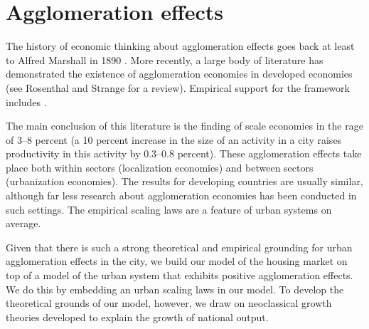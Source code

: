\section{Agglomeration effects}
The history of economic thinking about agglomeration effects goes back at least to  Alfred Marshall in 1890 \cite{giddingsPRINCIPLESECONOMICSAlfred1890}. %
More recently, a large body of literature has demonstrated the existence of agglomeration economies in developed economies (see Rosenthal and Strange \cite{rosenthalEvidenceNatureSources2004} for a review). Empirical support for the framework includes \cite{spenceUrbanizationGrowth2009, durantonAreCitiesEngines2009, durantonHumanCapitalExternalities2007}. 

The main conclusion of this literature is the finding of scale economies in the rage of 3--8 percent (a 10 percent increase in the size of an activity in a city raises productivity in this activity by 0.3--0.8 percent). These agglomeration effects take place both within sectors (localization economies) and between sectors (urbanization economies). The results for developing countries are usually similar, although far less research about agglomeration economies has been conducted in such settings. 
The empirical \glspl{scaling law} are a feature of urban systems on average. %


Given that there is such a strong theoretical and empirical grounding for urban agglomeration effects in the city, we build our model of the housing market on top of a model of the urban system that exhibits positive agglomeration effects. %
We do this by embedding an  urban \glspl{scaling law} in our model. To develop the theoretical grounds of our model, however, we draw on neoclassical growth theories developed to explain the growth of national output.




